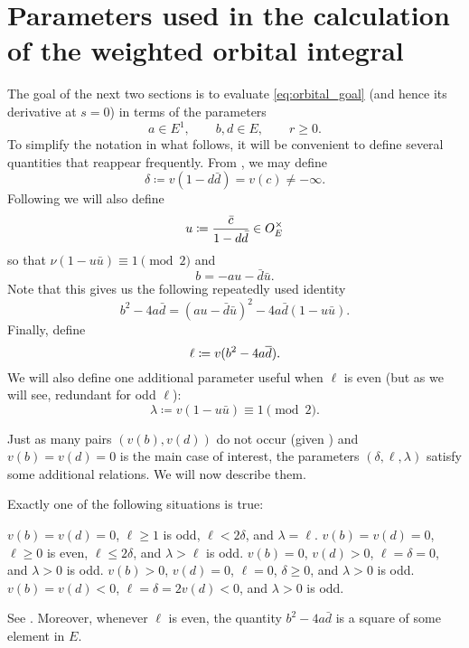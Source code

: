 \section{Parameters used in the calculation of the weighted orbital integral}
\label{sec:param_orbital0}
The goal of the next two sections is to evaluate \eqref{eq:orbital_goal}
(and hence its derivative at $s = 0$) in terms of the parameters
\[ a \in E^1, \qquad b, d \in E, \qquad r \ge 0. \]
To simplify the notation in what follows,
it will be convenient to define several quantities that reappear frequently.
From , we may define
\begin{equation}
  \delta \coloneqq v(1-d \bar d) = v(c) \neq -\infty.
  \label{eq:delta}
\end{equation}
Following \cite{ref:AFL} we will also define
\begin{equation}
  u \coloneqq \frac{\bar c}{1-d \bar d} \in O_E^\times
  \label{eq:u}
\end{equation}
so that $\nu(1-u \bar u) \equiv 1 \pmod 2$ and
\begin{equation}
  b = -au - \bar{d} \bar{u}.
  \label{eq:b}
\end{equation}
Note that this gives us the following repeatedly used identity
\begin{equation}
  b^2-4a\bar d = (au-\bar d \bar u)^2 - 4a\bar d(1-u\bar u).
  \label{eq:dos}
\end{equation}
Finally, define
\begin{equation}
  \ell \coloneqq v(b^2 - 4 a \overline d).
  \label{eq:ell}
\end{equation}
We will also define one additional parameter useful when $\ell$ is even
(but as we will see, redundant for odd $\ell$):
\begin{equation}
  \lambda \coloneqq v(1-u \bar u) \equiv 1 \pmod 2.
  \label{eq:lambda}
\end{equation}

Just as many pairs $(v(b), v(d))$ do not occur (given )
and $v(b) = v(d) = 0$ is the main case of interest,
the parameters $(\delta, \ell, \lambda)$ satisfy some additional relations.
We will now describe them.
\begin{proposition}
  \label{prop:parameter_constraints}
  Exactly one of the following situations is true:
  \begin{itemize}
    \ii $v(b) = v(d) = 0$, $\ell \ge 1$ is odd, $\ell < 2 \delta$, and $\lambda = \ell$.
    \ii $v(b) = v(d) = 0$, $\ell \ge 0$ is even, $\ell \le 2 \delta$, and $\lambda > \ell$ is odd.
    \ii $v(b) = 0$, $v(d) > 0$, $\ell = \delta = 0$, and $\lambda > 0$ is odd.
    \ii $v(b) > 0$, $v(d) = 0$, $\ell = 0$, $\delta \ge 0$, and $\lambda > 0$ is odd.
    \ii $v(b) = v(d) < 0$, $\ell = \delta = 2v(d) < 0$, and $\lambda > 0$ is odd.
  \end{itemize}
  See .
  Moreover, whenever $\ell$ is even,
  the quantity $b^2 - 4 a \bar d$ is a square of some element in $E$.
\end{proposition}

